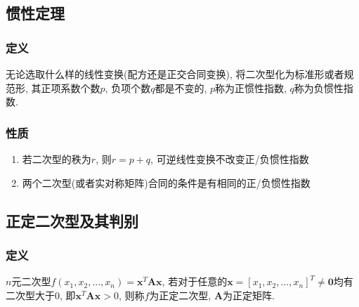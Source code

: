 \subsection{惯性定理}
\subsubsection{定义}
无论选取什么样的线性变换(配方还是正交合同变换), 将二次型化为标准形或者规范形, 其正项系数个数$ p $, 负项个数$ q $都是不变的, $ p $称为正惯性指数, $ q $称为负惯性指数.
\subsubsection{性质}
\begin{enumerate}
\item 若二次型的秩为$ r $, 则$ r=p+q $, 可逆线性变换不改变正/负惯性指数
\item 两个二次型(或者实对称矩阵)合同的条件是有相同的正/负惯性指数
\end{enumerate}
\subsection{正定二次型及其判别}
\subsubsection{定义}
$ n $元二次型$ f(x_{1}, x_{2},... ,x_{n})=\bm{x}^{T}\bm{A}\bm{x} $, 若对于任意的$ \bm{x}=[x_{1},x_{2},... ,x_{n}]^{T}\neq \bm{0} $均有二次型大于0, 即$ \bm{x}^{T}\bm{A}\bm{x}>0 $, 则称$ f $为正定二次型, $ \bm{A} $为正定矩阵.
